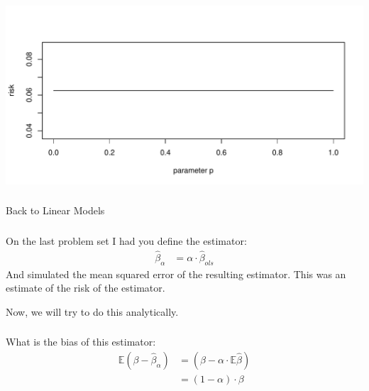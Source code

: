 \begin{frame}[fragile] \frametitle{}

\begin{center}
\includegraphics[width=\textwidth]{img/fig03.pdf}
\end{center}

\end{frame}

\begin{frame}[fragile] \frametitle{}

\begin{flushright}
{\color{yaleblue}\sc\fontsize{1cm}{0cm}\selectfont Back to Linear Models}
\end{flushright}

\end{frame}

\begin{frame}[fragile] \frametitle{}

On the last problem set I had you define the estimator:
\begin{align*}
\widehat{\beta}_{\alpha} &= \alpha \cdot \widehat{\beta}_{ols}
\end{align*}
And simulated the mean squared error of the resulting estimator.
This was an estimate of the risk of the estimator.

\pause Now, we will try to do this analytically.

\end{frame}

\begin{frame}[fragile] \frametitle{}

What is the bias of this estimator:
\begin{align*}
\mathbb{E} \left(\beta - \widehat{\beta}_{\alpha} \right) &= \left(\beta - \alpha \cdot \mathbb{E} \widehat{\beta} \right) \\
&= (1 - \alpha) \cdot \beta
\end{align*}

\end{frame}

